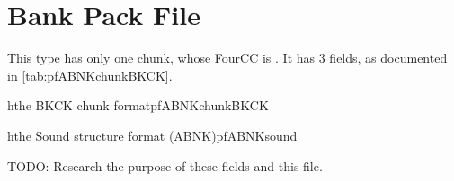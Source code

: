 \section{Bank Pack File}
\label{sec:pfABNK}

This type has only one chunk, whose FourCC is .  It
has 3 fields, as documented in \autoref{tab:pfABNKchunkBKCK}.

\begin{datastructure}{h}{the BKCK chunk format}{pfABNKchunkBKCK}
\end{datastructure}

\begin{datastructure}{h}{the Sound structure format (ABNK)}{pfABNKsound}
\end{datastructure}

TODO: Research the purpose of these fields and this file.

